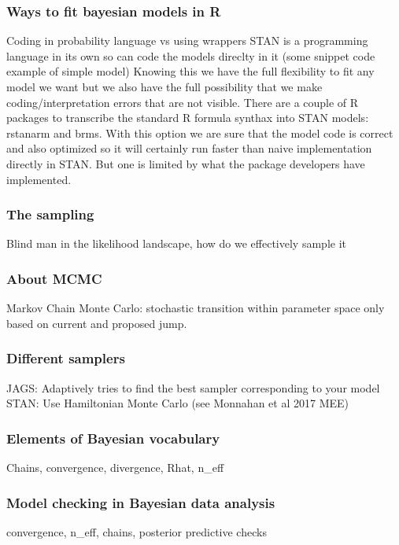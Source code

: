 \documentclass{beamer}
\begin{document}
 \begin{frame}
  \frametitle{\bf Ways to fit bayesian models in R}
  
  Coding in probability language vs using wrappers
  STAN is a programming language in its own so can code the models direclty in it (some snippet code example of simple model)
  Knowing this we have the full flexibility to fit any model we want but we also have the full possibility that we make coding/interpretation
  errors that are not visible.
  There are a couple of R packages to transcribe the standard R formula synthax into STAN models: rstanarm and brms. With this option we are sure that the model
  code is correct and also optimized so it will certainly run faster than naive implementation directly in STAN. But one is limited by what the package developers have
  implemented. 
  
 \end{frame}

  \begin{frame}
  \frametitle{\bf The sampling}
  
  Blind man in the likelihood landscape, how do we effectively sample it
  
 \end{frame}
 
 \begin{frame}
  \frametitle{\bf About MCMC}
  
  Markov Chain Monte Carlo: stochastic transition within parameter space only based on current and proposed jump.
  
 \end{frame}


  \begin{frame}
  \frametitle{\bf Different samplers}
  
  JAGS: Adaptively tries to find the best sampler corresponding to your model
  STAN: Use Hamiltonian Monte Carlo (see Monnahan et al 2017 MEE)
  
 \end{frame}
 
   
  \begin{frame}
  \frametitle{\bf Elements of Bayesian vocabulary}
  
  Chains, convergence, divergence, Rhat, n\_eff
  
 \end{frame}
 
  \begin{frame}
  \frametitle{\bf Model checking in Bayesian data analysis}
  
  convergence, n\_eff, chains, posterior predictive checks
  
 \end{frame}
 
\end{document}
